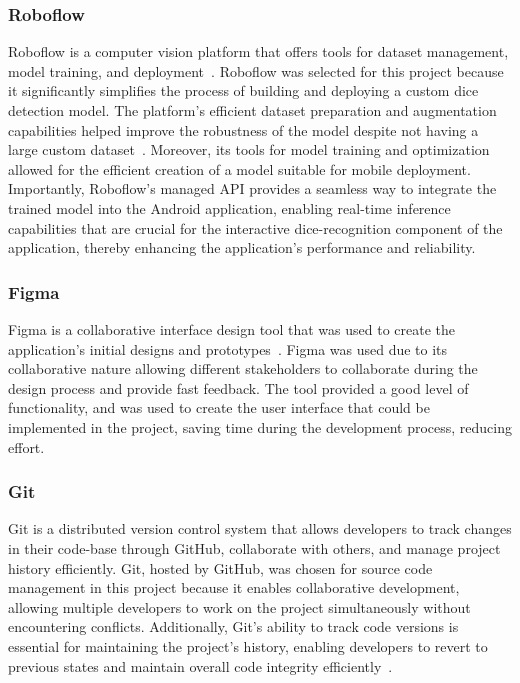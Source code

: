 \subsubsection{Roboflow}
\label{sec:roboflow}
Roboflow is a computer vision platform that offers tools for dataset management, model training, and deployment~\cite{bib:roboflow}. Roboflow was selected for this project because it significantly simplifies the process of building and deploying a custom dice detection model. The platform's efficient dataset preparation and augmentation capabilities helped improve the robustness of the model despite not having a large custom dataset~\cite{bib:kavidataset}. Moreover, its tools for model training and optimization allowed for the efficient creation of a model suitable for mobile deployment. Importantly, Roboflow's managed API provides a seamless way to integrate the trained model into the Android application, enabling real-time inference capabilities that are crucial for the interactive dice-recognition component of the application, thereby enhancing the application's performance and reliability.

\subsubsection{Figma}
\label{sec:figma}
Figma is a collaborative interface design tool that was used to create the application's initial designs and prototypes~\cite{bib:figma}. Figma was used due to its collaborative nature allowing different stakeholders to collaborate during the design process and provide fast feedback. The tool provided a good level of functionality, and was used to create the user interface that could be implemented in the project, saving time during the development process, reducing effort.

\subsubsection{Git}
\label{sec:git}
Git is a distributed version control system that allows developers to track changes in their code-base through GitHub, collaborate with others, and manage project history efficiently. Git, hosted by GitHub, was chosen for source code management in this project because it enables collaborative development, allowing multiple developers to work on the project simultaneously without encountering conflicts. Additionally, Git's ability to track code versions is essential for maintaining the project's history, enabling developers to revert to previous states and maintain overall code integrity efficiently~\cite{bib:git}.


